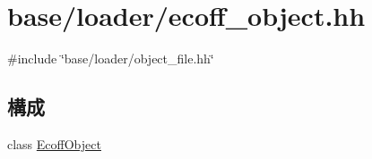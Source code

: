 \hypertarget{ecoff__object_8hh}{
\section{base/loader/ecoff\_\-object.hh}
\label{ecoff__object_8hh}
}
{\ttfamily \#include \char`\"{}base/loader/object\_\-file.hh\char`\"{}}\par
\subsection*{構成}
\begin{DoxyCompactItemize}
\item 
class \hyperlink{classEcoffObject}{EcoffObject}
\end{DoxyCompactItemize}
